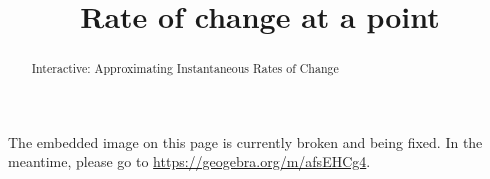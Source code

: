 \documentclass[handout]{ximera}
\title{Rate of change at a point}
\begin{document}
\begin{abstract} Interactive: Approximating Instantaneous Rates of Change
\end{abstract}

\maketitle

The embedded image on this page is currently broken and being fixed. In the meantime, please go to \url{https://geogebra.org/m/afsEHCg4}.

\end{document}
